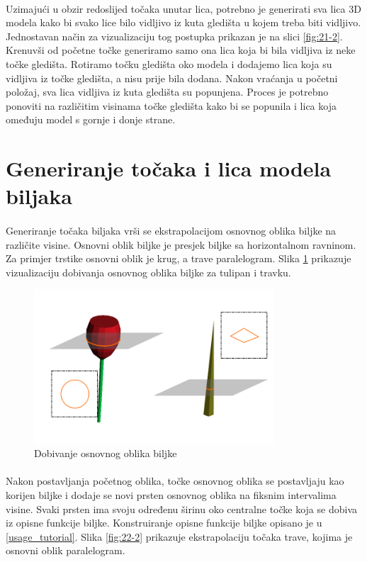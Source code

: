 \documentclass[times, utf8, diplomski]{fer}
\begin{document}
\paragraph{}
Uzimajući u obzir redoslijed točaka unutar lica, potrebno je generirati sva lica 3D modela 
kako bi svako lice bilo vidljivo iz kuta gledišta u kojem treba biti vidljivo. Jednostavan 
način za vizualizaciju tog postupka prikazan je na slici \ref{fig:21-2}. Krenuvši od 
početne točke generiramo samo ona lica koja bi bila vidljiva iz neke točke gledišta. 
Rotiramo točku gledišta oko modela i dodajemo lica koja su vidljiva iz točke gledišta, a 
nisu prije bila dodana. Nakon vraćanja u početni položaj, sva lica vidljiva iz kuta 
gledišta su popunjena. Proces je potrebno ponoviti na različitim visinama točke gledišta 
kako bi se popunila i lica koja omeđuju model s gornje i donje strane.


\section{Generiranje točaka i lica modela biljaka}
\paragraph{}
Generiranje točaka biljaka vrši se ekstrapolacijom osnovnog oblika biljke na različite 
visine. Osnovni oblik biljke je presjek biljke sa horizontalnom ravninom. Za primjer 
trstike osnovni oblik je krug, a trave paralelogram. Slika \ref{fig:22-1} prikazuje 
vizualizaciju dobivanja osnovnog oblika biljke za tulipan i travku.

\begin{figure}[h]
	\centering
	\includegraphics[width=0.8\textwidth]{img/22-1}
	\caption{Dobivanje osnovnog oblika biljke}
	\label{fig:22-1}
\end{figure}

\paragraph{}
Nakon postavljanja početnog oblika, točke osnovnog oblika se postavljaju kao korijen biljke 
i dodaje se novi prsten osnovnog oblika na fiksnim intervalima visine. Svaki prsten ima 
svoju određenu širinu oko centralne točke koja se dobiva iz opisne funkcije biljke. Konstruiranje opisne funkcije biljke opisano je u \ref{usage_tutorial}. Slika \ref{fig:22-2} prikazuje ekstrapolaciju točaka trave, kojima je osnovni oblik paralelogram.
\end{document}
